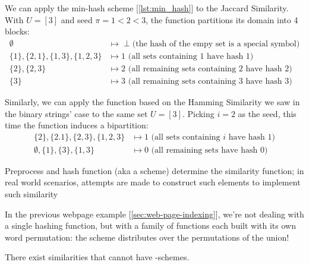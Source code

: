 \begin{example}
    We can apply the min-hash scheme [\ref{lst:min_hash}] to the Jaccard Similarity. With $U = [3]$ and seed $\pi = 1 < 2 < 3$, the function partitions its domain into 4 blocks:
    \begin{align*}
        \emptyset                           &\mapsto \perp \text{(the hash of the empy set is a special symbol)} \\
        \{1\}, \{2,1\}, \{1,3\}, \{1,2,3\}  &\mapsto 1 \text{ (all sets containing 1 have hash 1)} \\
        \{2\}, \{2,3\}                      &\mapsto 2 \text{ (all remaining sets containing 2 have hash 2)} \\
        \{3\}                               &\mapsto 3 \text{ (all remaining sets containing 3 have hash 3)}
    \end{align*}
\end{example} 

\begin{example}
    Similarly, we can apply the function based on the Hamming Similarity we saw in the binary strings' case to the same set $U = [3]$. Picking $i = 2$ as the seed, this time the function induces a bipartition:
    \begin{align*}
        \{2\}, \{2.1\}, \{2,3\}, \{1,2,3\}  &\mapsto 1 \text{ (all sets containing $i$ have hash 1)} \\
        \emptyset, \{1\}, \{3\}, \{1,3\}    &\mapsto 0 \text{ (all remaining sets have hash 0)}
    \end{align*}
\end{example}


\obs Preprocess and hash function (aka a scheme) determine the similarity function; in real world scenarios, attempts are made to construct such elements to implement such similarity

\obs In the previous webpage example [\ref{sec:web-page-indexing}], we're not dealing with a single hashing function, but with a family of functions each built with its own word permutation: the scheme distributes over the permutations of the union!


\begin{proposition} \label{ex:transitivity}
    There exist similarities that cannot have \lsh-schemes.
\end{proposition}

